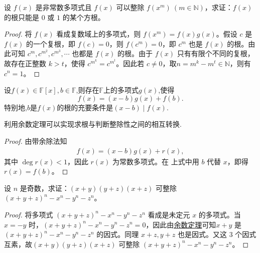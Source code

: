 \documentclass[../../main.tex]{subfiles}%
\begin{document}
\begin{example}
设 $f(x)$ 是非常数多项式且 $f(x)$ 可以整除 $f(x^m) \ (m \in \mathbb{N})$，求证：$f(x)$ 的根只能是 $0$ 或 $1$ 的某个方根。
\end{example}
\begin{proof}
将 $f(x)$ 看成复数域上的多项式，则 $f(x^m) = f(x)g(x)$。假设 $c$ 是 $f(x)$ 的一个复根，即 $f(c) = 0$，则 $f(c^m) = 0$，即 $c^m$ 也是 $f(x)$ 的根。由此可知 $c^m, c^{m^2}, c^{m^3}, \cdots$ 也都是 $f(x)$ 的根。由于 $f(x)$ 只有有限个不同的复根，故存在正整数 $k>t$，使得 $c^{m^k} = c^{m^t}$。因此若 $c \neq 0$，取$n=m^k-m^t\in \mathbb{N}$，则有 $c^n = 1$。
\end{proof}


\begin{theorem}[余数定理]\label{theorem:余数定理}
设\(f(x)\in\mathbb{F}[x], b\in\mathbb{F}\),则存在\(\mathbb{F}\)上的多项式\(g(x)\),使得
\[
f(x)=(x - b)g(x)+f(b).
\]
特别地,\(b\)是\(f(x)\)的根的充要条件是\((x - b)\mid f(x)\).
\end{theorem}
\begin{note}
利用余数定理可以实现求根与判断整除性之间的相互转换.
\end{note}
\begin{proof}
由带余除法知
\begin{align*}
f(x) = (x - b)g(x) + r(x),
\end{align*}
其中 $\deg r(x) < 1$，因此 $r(x)$ 为常数多项式。在 上式中用 $b$ 代替 $x$，即得 $r(x) = f(b)$。
\end{proof}

\begin{example}
设 $n$ 是奇数，求证：$(x + y)(y + z)(x + z)$ 可整除 $(x + y + z)^n - x^n - y^n - z^n$。
\end{example}
\begin{proof}
将多项式 $(x + y + z)^n - x^n - y^n - z^n$ 看成是未定元 $x$ 的多项式。当 $x = -y$ 时，$(x + y + z)^n - x^n - y^n - z^n = 0$，因此由\hyperref[theorem:余数定理]{余数定理}可知$x + y$ 是 $(x + y + z)^n - x^n - y^n - z^n$ 的因式。同理 $x + z, y + z$ 也是因式。又这 3 个因式互素，故$(x + y)(y + z)(x + z)$ 可整除 $(x + y + z)^n - x^n - y^n - z^n$。
\end{proof}
\end{document}

